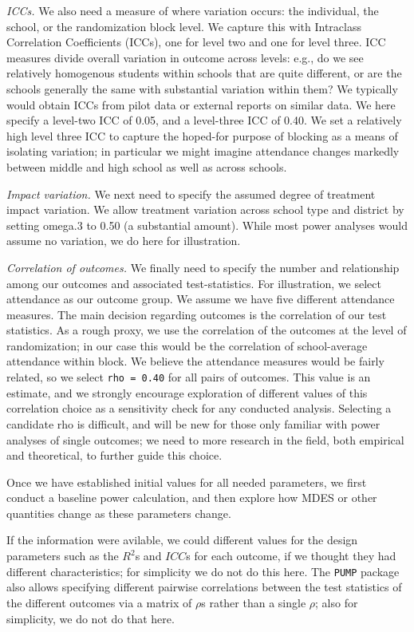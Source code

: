 \documentclass[
]{article}
\begin{document}
\emph{ICCs.} We also need a measure of where variation occurs: the
individual, the school, or the randomization block level. We capture
this with Intraclass Correlation Coefficients (ICCs), one for level two
and one for level three. ICC measures divide overall variation in
outcome across levels: e.g., do we see relatively homogenous students
within schools that are quite different, or are the schools generally
the same with substantial variation within them? We typically would
obtain ICCs from pilot data or external reports on similar data. We here
specify a level-two ICC of 0.05, and a level-three ICC of 0.40. We set a
relatively high level three ICC to capture the hoped-for purpose of
blocking as a means of isolating variation; in particular we might
imagine attendance changes markedly between middle and high school as
well as across schools.

\emph{Impact variation.} We next need to specify the assumed degree of
treatment impact variation. We allow treatment variation across school
type and district by setting omega.3 to 0.50 (a substantial amount).
While most power analyses would assume no variation, we do here for
illustration.

\emph{Correlation of outcomes.} We finally need to specify the number
and relationship among our outcomes and associated test-statistics. For
illustration, we select attendance as our outcome group. We assume we
have five different attendance measures. The main decision regarding
outcomes is the correlation of our test statistics. As a rough proxy, we
use the correlation of the outcomes at the level of randomization; in
our case this would be the correlation of school-average attendance
within block. We believe the attendance measures would be fairly
related, so we select \texttt{rho\ =\ 0.40} for all pairs of outcomes.
This value is an estimate, and we strongly encourage exploration of
different values of this correlation choice as a sensitivity check for
any conducted analysis. Selecting a candidate rho is difficult, and will
be new for those only familiar with power analyses of single outcomes;
we need to more research in the field, both empirical and theoretical,
to further guide this choice.

Once we have established initial values for all needed parameters, we
first conduct a baseline power calculation, and then explore how MDES or
other quantities change as these parameters change.

If the information were avilable, we could different values for the
design parameters such as the \(R^2\)s and \(ICC\)s for each outcome, if
we thought they had different characteristics; for simplicity we do not
do this here. The \texttt{PUMP} package also allows specifying different
pairwise correlations between the test statistics of the different
outcomes via a matrix of \(\rho\)s rather than a single \(\rho\); also
for simplicity, we do not do that here.
\end{document}
